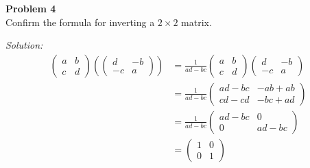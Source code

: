 \documentclass{article}
\newenvironment{problem}[2][Problem]
    { \begin{mdframed}[backgroundcolor=gray!20] \textbf{#1 #2} \\}
    {  \end{mdframed}}
\newenvironment{solution}
    {\textit{Solution:}}
    {}
\begin{document}
\begin{problem}{4}
Confirm the formula for inverting a $2 \times 2$ matrix.
\end{problem}
\begin{solution}
\begin{align*}
\begin{pmatrix}
a & b \\
c & d 
\end{pmatrix}\left (  \begin{pmatrix}
d & -b \\
-c & a 
\end{pmatrix} 
\right ) &=\frac{1}{ad -bc} \begin{pmatrix}
a & b \\
c & d 
\end{pmatrix}  \begin{pmatrix}
d & -b \\
-c & a 
\end{pmatrix}  \\
&= \frac{1}{ad -bc} \begin{pmatrix}
ad - bc & -ab + ab \\
cd - cd & -bc + ad 
\end{pmatrix}\\
&= \frac{1}{ad -bc} \begin{pmatrix}
ad - bc & 0 \\
0 & ad -bc   
\end{pmatrix}\\
&= \begin{pmatrix}
1 & 0 \\
0 & 1
\end{pmatrix}
\end{align*}

%
%

\end{solution}
\end{document}
